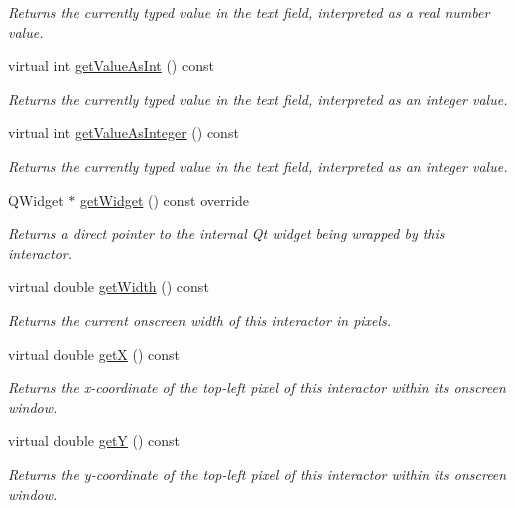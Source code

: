 \begin{DoxyCompactItemize}
\begin{DoxyCompactList}\small\item\em Returns the currently typed value in the text field, interpreted as a real number value. \end{DoxyCompactList}\item 
virtual int \mbox{\hyperlink{classsgl_1_1GTextField_a5e50caa202955b726a44a1dfbc6f7818}{get\+Value\+As\+Int}} () const
\begin{DoxyCompactList}\small\item\em Returns the currently typed value in the text field, interpreted as an integer value. \end{DoxyCompactList}\item 
virtual int \mbox{\hyperlink{classsgl_1_1GTextField_a1cbf643145c03ed4c238d085fc88cf33}{get\+Value\+As\+Integer}} () const
\begin{DoxyCompactList}\small\item\em Returns the currently typed value in the text field, interpreted as an integer value. \end{DoxyCompactList}\item 
Q\+Widget $\ast$ \mbox{\hyperlink{classsgl_1_1GTextField_a3b33a602b31a6b809d020535a59db3b4}{get\+Widget}} () const override
\begin{DoxyCompactList}\small\item\em Returns a direct pointer to the internal Qt widget being wrapped by this interactor. \end{DoxyCompactList}\item 
virtual double \mbox{\hyperlink{classsgl_1_1GInteractor_a0ed2965abd4f5701d2cadf71239faf19}{get\+Width}} () const
\begin{DoxyCompactList}\small\item\em Returns the current onscreen width of this interactor in pixels. \end{DoxyCompactList}\item 
virtual double \mbox{\hyperlink{classsgl_1_1GInteractor_a344385751bee0720059403940d57a13e}{getX}} () const
\begin{DoxyCompactList}\small\item\em Returns the x-\/coordinate of the top-\/left pixel of this interactor within its onscreen window. \end{DoxyCompactList}\item 
virtual double \mbox{\hyperlink{classsgl_1_1GInteractor_aafa51c7f8f38a09febbb9ce7853f77b4}{getY}} () const
\begin{DoxyCompactList}\small\item\em Returns the y-\/coordinate of the top-\/left pixel of this interactor within its onscreen window. \end{DoxyCompactList}\item 

\end{DoxyCompactItemize}

